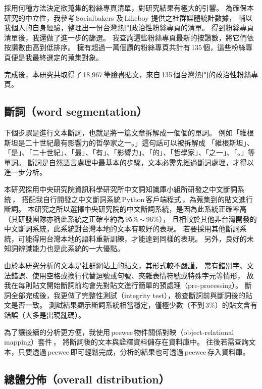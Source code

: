 \documentclass[letterpaper, 10pt, conference]{ieeeconf}   %
\begin{document}
\begin{CJK}{UTF8}{bsmi}
採用何種方法決定欲蒐集的粉絲專頁清單，對研究結果有極大的引響。
為確保本研究的中立性，我參考\,Socialbakers\,\cite{c4}\,及\,Likeboy\,\cite{c5}\,提供之社群媒體統計數據，
輔以我個人的自身經驗，整理出一份台灣熱門政治性粉絲專頁的清單。
得到粉絲專頁清單後，我還做了進一步的篩選。
我查詢這些粉絲專頁最新的按讚數，將它們依按讚數由高到低排序。
擁有超過一萬個讚的粉絲專頁共計有\,135\,個，這些粉絲專頁便是我最終選定的蒐集對象。

完成後，本研究共取得了\,18,967\,筆臉書貼文，來自\,135\,個台灣熱門的政治性粉絲專頁。

\subsection*{斷詞（word segmentation）}

下個步驟是進行文本斷詞，也就是將一篇文章拆解成一個個的單詞。
例如「維根斯坦是二十世紀最有影響力的哲學家之一。」這句話可以被拆解成
「維根斯坦」、「是」、「二十世紀」、「最」、「有」、「影響力」、「的」、「哲學家」、「之一」、「。」等單詞。
斷詞是自然語言處理中最基本的步驟，文本必需先經過斷詞處理，才得以進一步分析。

本研究採用中央研究院資訊科學研究所中文詞知識庫小組所研發之中文斷詞系統\,\cite{c6}，
搭配我自行開發之中文斷詞系統\,Python\,客戶端程式\,\cite{c7}，為蒐集到的貼文進行斷詞。
本研究之所以選擇中央研究院的中文斷詞系統，是因為此系統正確率高（其研發團隊亦稱此系統之正確率約為\,95\%\,$\sim$\,96\%），
且相較於其他非台灣開發的中文斷詞系統，此系統對台灣本地的文本有較好的表現。
若要採用其他斷詞系統，可能得用台灣本地的語料重新訓練，才能達到同樣的表現。
另外，良好的未知詞辨識能力也是此系統的一大優點。

由於本研究分析的文本是社群網站上的貼文，其形式較不嚴謹，
常有錯別字、文法錯誤、使用空格或換行代替逗號或句號、夾雜表情符號或特殊字元等情形，
故我在每則貼文開始斷詞前均會先對貼文進行簡單的預處理（pre-processing）。
斷詞全部完成後，我更做了完整性測試（integrity test），檢查斷詞前與斷詞後的貼文是否一致。
測試結果顯示斷詞系統相當穩定，僅極少數（不到\,3\%）的貼文含有錯誤（大多是出現亂碼）。

為了讓後續的分析更方便，我使用\,peewee\,物件關係對映（object-relational mapping）套件\,\cite{c8}，
將斷詞後的文本與詮釋資料儲存在資料庫中。
往後若需查詢文本，只要透過\,peewee\,即可輕鬆完成，分析的結果也可透過\,peewee\,存入資料庫。

\subsection*{總體分佈（overall distribution）}


\end{CJK}
\end{document}
